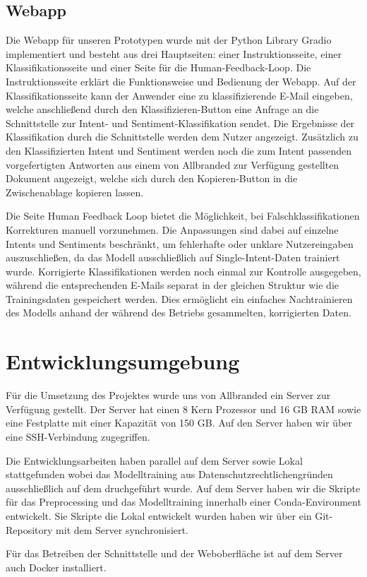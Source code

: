 \subsection{Webapp}

Die Webapp für unseren Prototypen wurde mit der Python Library Gradio implementiert und besteht
aus drei Hauptseiten: einer Instruktionsseite, einer Klassifikationsseite und einer Seite für
die Human-Feedback-Loop. Die Instruktionsseite erklärt die Funktionsweise und Bedienung
der Webapp. Auf der Klassifikationsseite kann der Anwender eine zu klassifizierende E-Mail
eingeben, welche anschließend durch den Klassifizieren-Button eine Anfrage an die Schnittstelle
zur Intent- und Sentiment-Klassifikation sendet. Die Ergebnisse der Klassifikation durch die
Schnittstelle werden dem Nutzer angezeigt. Zusätzlich zu den Klassifizierten Intent und Sentiment
werden noch die zum Intent passenden vorgefertigten Antworten aus einem von Allbranded zur
Verfügung gestellten Dokument angezeigt, welche sich durch den Kopieren-Button in die
Zwischenablage kopieren lassen.  

Die Seite Human Feedback Loop bietet die Möglichkeit, bei Falschklassifikationen Korrekturen
manuell vorzunehmen. Die Anpassungen sind dabei auf einzelne Intents und Sentiments beschränkt,
um fehlerhafte oder unklare Nutzereingaben auszuschließen, da das Modell ausschließlich auf
Single-Intent-Daten trainiert wurde. Korrigierte Klassifikationen werden noch einmal zur
Kontrolle ausgegeben, während die entsprechenden E-Mails separat in der gleichen Struktur
wie die Trainingsdaten gespeichert werden. Dies ermöglicht ein einfaches Nachtrainieren des
Modells anhand der während des Betriebs gesammelten, korrigierten Daten. 

\section{Entwicklungsumgebung}

Für die Umsetzung des Projektes wurde uns von Allbranded ein Server zur Verfügung gestellt.
Der Server hat einen 8 Kern Prozessor und 16 GB RAM sowie eine Festplatte mit einer Kapazität von 150 GB.
Auf den Server haben wir über eine SSH-Verbindung zugegriffen.  

Die Entwicklungsarbeiten haben parallel auf dem Server sowie Lokal stattgefunden wobei das Modelltraining
aus Datenschutzrechtlichengründen ausschließlich auf dem druchgeführt wurde. Auf dem Server haben wir die
Skripte für das Preprocessing und das Modelltraining innerhalb einer Conda-Environment entwickelt. Sie
Skripte die Lokal entwickelt wurden haben wir über ein Git-Repository mit dem Server synchronisiert.  

Für das Betreiben der Schnittstelle und der Weboberfläche ist auf dem Server auch Docker installiert.
